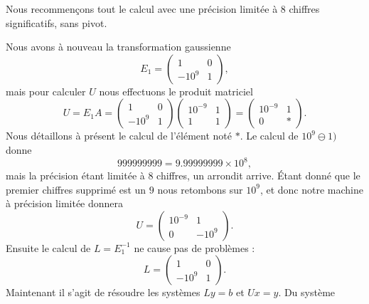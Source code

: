 \begin{example}     \label{EXooNVRNooJgQmQc}
	Nous recommençons tout le calcul avec une précision limitée à \( 8\) chiffres significatifs, sans pivot.

	Nous avons à nouveau la transformation gaussienne
	\begin{equation}
		E_1=\begin{pmatrix}
			1     & 0 \\
			-10^9 & 1
		\end{pmatrix},
	\end{equation}
	mais pour calculer \( U\) nous effectuons le produit matriciel
	\begin{equation}
		U=E_1A=\begin{pmatrix}
			1     & 0 \\
			-10^9 & 1
		\end{pmatrix}\begin{pmatrix}
			10^{-9} & 1 \\
			1       & 1
		\end{pmatrix}=\begin{pmatrix}
			10^{-9} & 1 \\
			0       & *
		\end{pmatrix}.
	\end{equation}
	Nous détaillons à présent le calcul de l'élément noté \( *\). Le calcul de \( 10^9\ominus 1)\) donne
	\begin{equation}
		999999999=9.99999999\times 10^{8},
	\end{equation}
	mais la précision étant limitée à \( 8\) chiffres, un arrondit arrive. Étant donné que le premier chiffres supprimé est un \( 9\) nous retombons sur \( 10^9\), et donc notre machine à précision limitée donnera
	\begin{equation}
		U=\begin{pmatrix}
			10^{-9} & 1       \\
			0       & -10^{9}
		\end{pmatrix}.
	\end{equation}
	Ensuite le calcul de \( L=E_1^{-1}\) ne cause pas de problèmes :
	\begin{equation}
		L=\begin{pmatrix}
			1     & 0 \\
			-10^9 & 1
		\end{pmatrix}.
	\end{equation}
	Maintenant il s'agit de résoudre les systèmes \( Ly=b\) et \( Ux=y\). Du système
	\begin{equation}

\end{equation}
\end{example}
